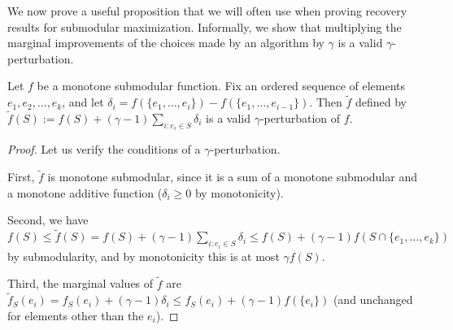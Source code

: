 We now prove a useful proposition that we will often use when proving recovery results for submodular maximization. Informally, we show that multiplying the marginal improvements of the choices made by an algorithm by $\gamma$ is a valid $\gamma$-perturbation. 

\begin{proposition}
\label{prop:perturb}
Let $f$ be a monotone submodular function.
Fix an ordered sequence of elements $e_1,e_2,\dots,e_k$, and let $\delta_i = f(\{e_1,\ldots,e_i\}) - f(\{e_1,\ldots,e_{i-1}\})$.
Then $\tilde{f}$ defined by $\tilde{f}(S) := f(S) + (\gamma-1) \sum_{i: e_i \in S} \delta_i $ is a valid $\gamma$-perturbation of $f$.
\end{proposition}

\begin{proof}
Let us verify the conditions of a $\gamma$-perturbation.

First, $\tilde{f}$ is monotone submodular, since it is a sum of a monotone submodular and a monotone additive function ($\delta_i \geq 0$ by monotonicity).

Second, we have $f(S) \leq \tilde{f}(S) = f(S) + (\gamma-1) \sum_{i: e_i \in S} \delta_i \leq f(S) + (\gamma-1) f(S \cap \{e_1,\ldots,e_k\})$ by submodularity, and by monotonicity this is at most $\gamma f(S)$.

Third, the marginal values of $\tilde{f}$ are $\tilde{f}_S(e_i) = f_S(e_i) + (\gamma-1) \delta_i \leq f_S(e_i) + (\gamma-1) f(\{e_i\})$ (and unchanged for elements other than the $e_i$). 
\end{proof}




